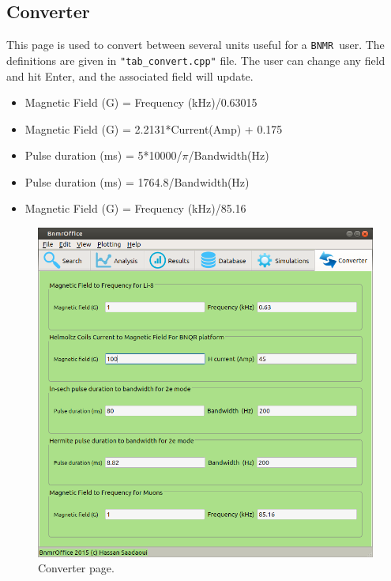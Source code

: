 \documentclass[10pt,letterpaper,oneside]{article}
\newcommand{\bnmrg}{\texttt{BNMR}}
\begin{document}
\subsection{Converter}
This page is used to convert between several units useful for a \bnmrg\
user. The definitions are given in \verb+"tab_convert.cpp"+ file. The user can change any field and hit Enter, and the associated field will update.
\begin{itemize}
\item Magnetic Field (G)  = Frequency (kHz)/0.63015
\item Magnetic Field (G)  = 2.2131*Current(Amp) + 0.175
\item Pulse duration (ms) =  5*10000/$\pi$/Bandwidth(Hz)
\item Pulse duration (ms) =  1764.8/Bandwidth(Hz)
\item Magnetic Field (G) =  Frequency (kHz)/85.16
\end{itemize}
\begin{figure}[h]
\center
\includegraphics[width=\textwidth]{converter.png}
 \caption{Converter page.}
 \label{fig-mag}
 \end{figure}
\end{document}
